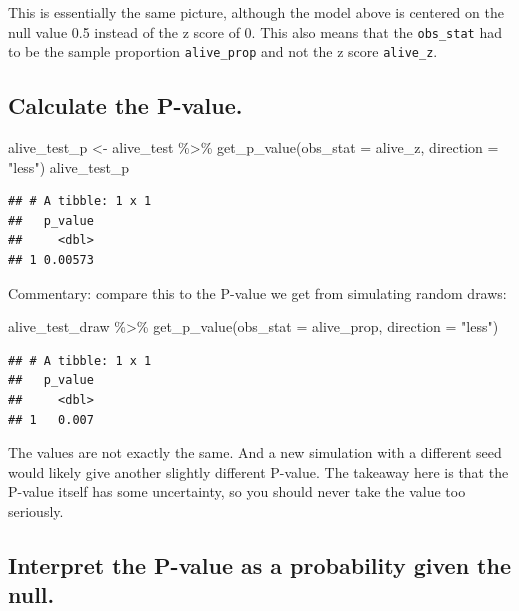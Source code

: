 \documentclass[
]{book}
\newenvironment{Shaded}{\begin{snugshade}}{\end{snugshade}}
\newcommand{\AttributeTok}[1]{\textcolor[rgb]{0.77,0.63,0.00}{#1}}
\newcommand{\FunctionTok}[1]{\textcolor[rgb]{0.00,0.00,0.00}{#1}}
\newcommand{\NormalTok}[1]{#1}
\newcommand{\OtherTok}[1]{\textcolor[rgb]{0.56,0.35,0.01}{#1}}
\newcommand{\SpecialCharTok}[1]{\textcolor[rgb]{0.00,0.00,0.00}{#1}}
\newcommand{\StringTok}[1]{\textcolor[rgb]{0.31,0.60,0.02}{#1}}
\begin{document}
This is essentially the same picture, although the model above is centered on the null value 0.5 instead of the z score of 0. This also means that the \texttt{obs\_stat} had to be the sample proportion \texttt{alive\_prop} and not the z score \texttt{alive\_z}.

\hypertarget{one-prop-ex-calculate-p}{%
\subsection{Calculate the P-value.}\label{one-prop-ex-calculate-p}}

\begin{Shaded}
\begin{Highlighting}[]
\NormalTok{alive\_test\_p }\OtherTok{\textless{}{-}}\NormalTok{ alive\_test }\SpecialCharTok{\%\textgreater{}\%}
    \FunctionTok{get\_p\_value}\NormalTok{(}\AttributeTok{obs\_stat =}\NormalTok{ alive\_z, }\AttributeTok{direction =} \StringTok{"less"}\NormalTok{)}
\NormalTok{alive\_test\_p}
\end{Highlighting}
\end{Shaded}

\begin{verbatim}
## # A tibble: 1 x 1
##   p_value
##     <dbl>
## 1 0.00573
\end{verbatim}

Commentary: compare this to the P-value we get from simulating random draws:

\begin{Shaded}
\begin{Highlighting}[]
\NormalTok{alive\_test\_draw }\SpecialCharTok{\%\textgreater{}\%}
    \FunctionTok{get\_p\_value}\NormalTok{(}\AttributeTok{obs\_stat =}\NormalTok{ alive\_prop, }\AttributeTok{direction =} \StringTok{"less"}\NormalTok{)}
\end{Highlighting}
\end{Shaded}

\begin{verbatim}
## # A tibble: 1 x 1
##   p_value
##     <dbl>
## 1   0.007
\end{verbatim}

The values are not exactly the same. And a new simulation with a different seed would likely give another slightly different P-value. The takeaway here is that the P-value itself has some uncertainty, so you should never take the value too seriously.

\hypertarget{one-prop-ex-interpret-p}{%
\subsection{Interpret the P-value as a probability given the null.}\label{one-prop-ex-interpret-p}}
\end{document}
